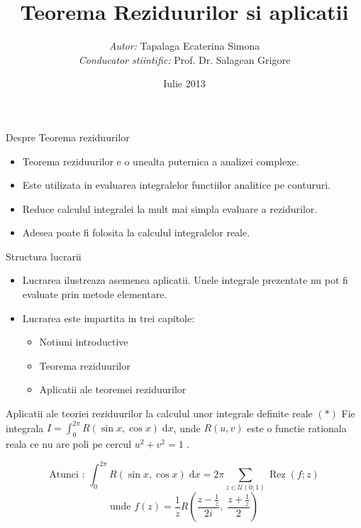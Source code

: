 \documentclass{beamer}
\title[Teorema Reziduurilor si aplicatii]{Teorema Reziduurilor si aplicatii}
\author{\emph{Autor:} Tapalaga Ecaterina Simona \\ \emph{Conducator stiintific:} Prof. Dr. Salagean Grigore}
\institute{\textsc{Universitatea Babes-Bolyai Cluj-Napoca} \par
            \textsc{Facultatea de Matematica si Informatica} }
\date{Iulie 2013}
\DeclareMathOperator{\Rez}{Rez}
\newcommand{\dd}{\; \mathrm{d}}
\begin{document}
    \begin{frame}
        \titlepage
    \end{frame}

    \begin{frame}{Despre Teorema reziduurilor}
        \begin{itemize}
            \item Teorema reziduurilor e o unealta puternica a analizei complexe.
            \item Este utilizata in evaluarea integralelor functiilor analitice pe contururi.
            \item Reduce calculul integralei la mult mai simpla evaluare a rezidurilor.
            \item Adesea poate fi folosita la calculul integralelor reale.
        \end{itemize}
    \end{frame}

    \begin{frame}{Structura lucrarii}
        \begin{itemize}
            \item Lucrarea ilustreaza asemenea aplicatii. Unele integrale prezentate nu pot fi evaluate prin metode elementare.
            \item Lucrarea este impartita in trei capitole:

            \begin{itemize}
                \item Notiuni introductive
                \item Teorema reziduurilor
                \item Aplicatii ale teoremei reziduurilor
            \end{itemize}

        \end{itemize}
    \end{frame}

    \begin{frame}{Aplicatii ale teoriei reziduurilor la calculul unor integrale definite reale }
        $(*)$ Fie integrala $\displaystyle I=\int_{0}^{2\pi} R(\sin x, \cos x) \dd x$, unde
        $R(u,v)$ este o functie rationala reala ce nu are poli pe cercul $u^2+v^2=1$ .

        \[
            \text{Atunci : } \int_{0}^{2\pi} R(\sin x , \cos x) \dd x =
            2\pi \sum_{z\in \mathcal{U}(0;1)} \Rez(f;z)
        \]
        \[
            \text{unde } f(z) = \frac{1}{z} R\left(\frac{z-\frac{1}{z}}{2i},\; \frac{z+\frac{1}{z}}{2} \right)
        \]
    \end{frame}
\end{document}
